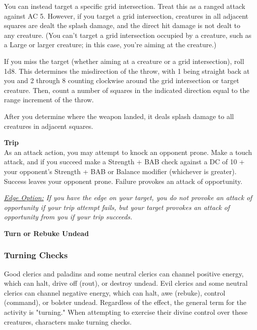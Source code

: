 You can instead target a specific grid intersection. Treat this as a ranged attack against AC 5. However, if you target a grid intersection, creatures in all adjacent squares are dealt the splash damage, and the direct hit damage is not dealt to any creature. (You can't target a grid intersection occupied by a creature, such as a Large or larger creature; in this case, you're aiming at the creature.)

If you miss the target (whether aiming at a creature or a grid intersection), roll 1d8. This determines the misdirection of the throw, with 1 being straight back at you and 2 through 8 counting clockwise around the grid intersection or target creature. Then, count a number of squares in the indicated direction equal to the range increment of the throw.

After you determine where the weapon landed, it deals splash damage to all creatures in adjacent squares.\\

\hypertarget{combat:trip}{}
\normalsize\item\textbf{{Trip}}\\\small
As an attack action, you may attempt to knock an opponent prone. Make a touch attack, and if you succeed make a Strength + BAB check against a DC of 10 + your opponent's Strength + BAB or Balance modifier (whichever is greater). Success leaves your opponent prone. Failure provokes an attack of opportunity.


\smallskip\emph{\underline{Edge Option:} If you have the edge on your target, you do not provoke an attack of opportunity if your trip attempt fails, but your target provokes an attack of opportunity from you if your trip succeeds.}\\

\hypertarget{combat:turning}{}
\normalsize\item\textbf{{Turn or Rebuke Undead}}\\\small

\subsubsection{Turning Checks}

Good clerics and paladins and some neutral clerics can channel positive energy, which can halt, drive off (rout), or destroy undead.
Evil clerics and some neutral clerics can channel negative energy, which can halt, awe (rebuke), control (command), or bolster undead.
Regardless of the effect, the general term for the activity is "turning." When attempting to exercise their divine control over these creatures, characters make turning checks.

